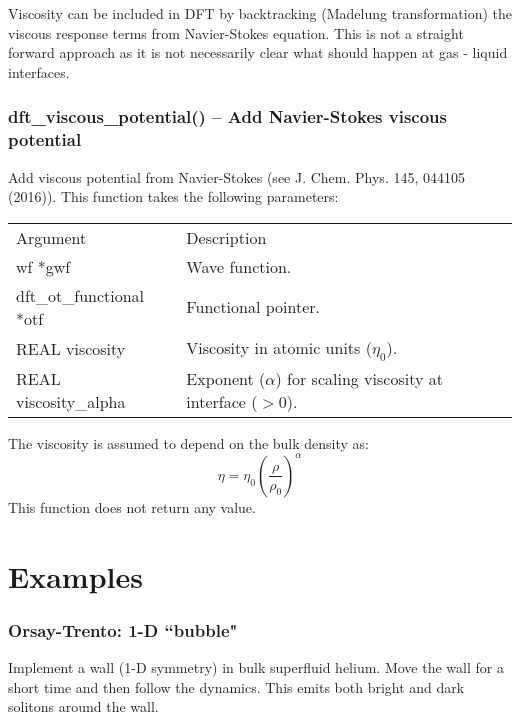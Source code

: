 \documentclass[12pt,letterpaper]{report}
\begin{document}
Viscosity can be included in DFT by backtracking (Madelung transformation) the viscous response terms from Navier-Stokes equation. This is not a straight forward approach as it is not necessarily clear what should happen at gas - liquid interfaces.

\subsection{dft\_viscous\_potential() -- Add Navier-Stokes viscous potential}

Add viscous potential from Navier-Stokes (see J. Chem. Phys. 145, 044105 (2016)). This function takes the following parameters:
\begin{longtable}{p{} p{}}
Argument & Description\\
\cline{1-2}
wf *gwf & Wave function.\\
dft\_ot\_functional *otf & Functional pointer.\\
REAL viscosity & Viscosity in atomic units ($\eta_0$).\\
REAL viscosity\_alpha & Exponent ($\alpha$) for scaling viscosity at interface ($> 0$).\\
\end{longtable}
\noindent
The viscosity is assumed to depend on the bulk density as:
$$\eta = \eta_0\left(\frac{\rho}{\rho_0}\right)^\alpha$$
This function does not return any value.

\chapter{Examples}

\subsection{Orsay-Trento: 1-D ``bubble"}

Implement a wall (1-D symmetry) in bulk superfluid helium. Move the wall for a short time and then follow the dynamics. This emits both bright and dark solitons around the wall.
\end{document}
